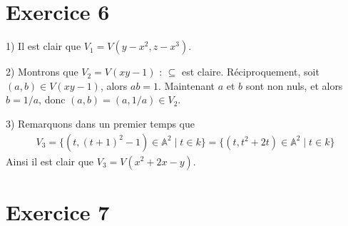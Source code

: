     \section{Exercice 6}
        \begin{question}{1)}
            Il est clair que $V_1 = V(y - x^2, z - x^3)$.
        \end{question}
        \begin{question}{2)}
            Montrons que $V_2 = V(xy - 1)$ : $\subseteq$ est claire. Réciproquement, soit $(a,b) \in V(xy - 1)$, alors $ab = 1$. Maintenant $a$ et $b$ sont non nuls, et alors $b = 1/a$, donc $(a,b) = (a, 1/a) \in V_2$.
        \end{question}
        \begin{question}{3)}
            Remarquons dans un premier temps que
            \begin{align*}
                V_3 = \{(t, (t+1)^2 - 1) \in \mathbb{A}^2 \mid t \in k\} = \{(t, t^2 + 2t)\in \mathbb{A}^2 \mid t \in k\}
            \end{align*}
            Ainsi il est clair que $V_3 = V(x^2 + 2x - y)$.
        \end{question}

    \section{Exercice 7}